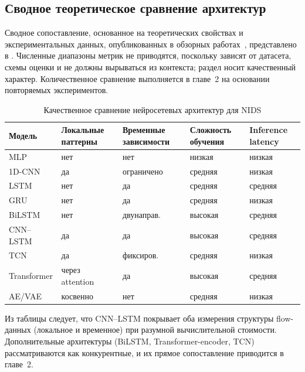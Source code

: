 \subsection{Сводное теоретическое сравнение архитектур}

Сводное сопоставление, основанное на теоретических свойствах и
экспериментальных данных, опубликованных в обзорных
работах~\cite{khraisat2019survey, ahmad2021nids, liu2019survey,
ferrag2020dlcyber, vinayakumar2019dl}, представлено в .
Численные диапазоны метрик не приводятся, поскольку зависят от датасета,
схемы оценки и не должны вырываться из контекста; раздел носит качественный
характер. Количественное сравнение выполняется в главе~2 на основании
повторяемых экспериментов.

\begin{table}[H]
\centering
\caption{Качественное сравнение нейросетевых архитектур для NIDS}
\label{tab:dl-arch-compare}
\renewcommand{\arraystretch}{1.2}
\begin{tabularx}{\linewidth}{@{}lXXXX@{}}
\toprule
\textbf{Модель} & \textbf{Локальные паттерны} & \textbf{Временные зависимости} &
\textbf{Сложность обучения} & \textbf{Inference latency} \\
\midrule
MLP        & нет          & нет        & низкая  & низкая \\
1D-CNN     & да           & ограничено & средняя & низкая \\
LSTM       & нет          & да         & средняя & средняя \\
GRU        & нет          & да         & средняя & низкая \\
BiLSTM     & нет          & двунаправ. & высокая & средняя \\
CNN--LSTM  & да           & да         & высокая & средняя \\
TCN        & да           & фиксиров.  & средняя & низкая \\
Transformer& через attention & да      & высокая & средняя \\
AE/VAE     & косвенно     & нет        & средняя & низкая \\
\bottomrule
\end{tabularx}
\end{table}

Из таблицы следует, что CNN--LSTM покрывает оба измерения структуры flow-данных
(локальное и временное) при разумной вычислительной стоимости. Дополнительные
архитектуры (BiLSTM, Transformer-encoder, TCN) рассматриваются как
конкурентные, и их прямое сопоставление приводится в главе~2.

